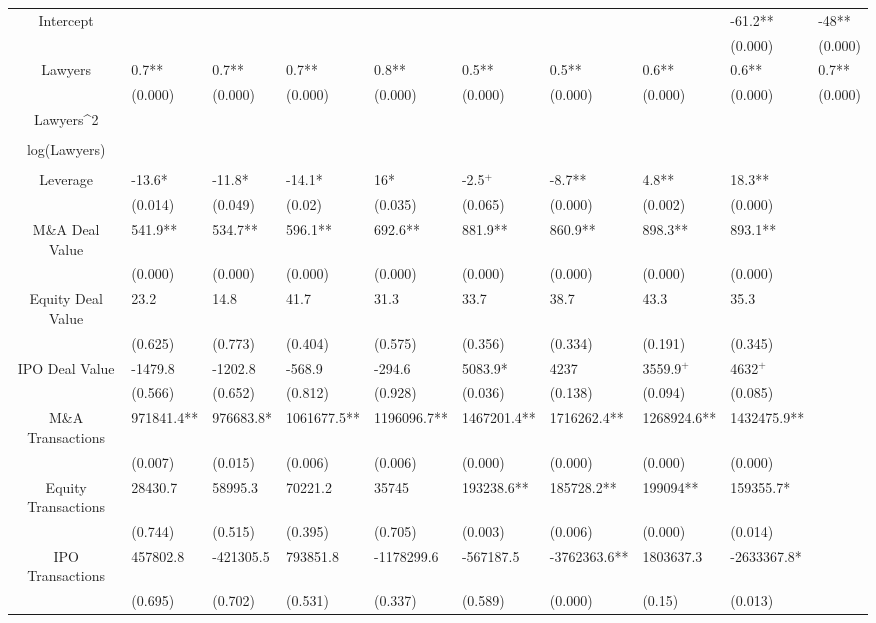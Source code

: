 \documentclass{article}
\begin{document}
\begin{table}[H]
\begin{tabular}{|clllllllll|}
Intercept &  &  &  &  &  &  &  & -61.2** & -48** \\ 
   &  &  &  &  &  &  &  & (0.000) & (0.000) \\ 
  Lawyers & 0.7** & 0.7** & 0.7** & 0.8** & 0.5** & 0.5** & 0.6** & 0.6** & 0.7** \\ 
   & (0.000) & (0.000) & (0.000) & (0.000) & (0.000) & (0.000) & (0.000) & (0.000) & (0.000) \\ 
  Lawyers^2 &  &  &  &  &  &  &  &  &  \\ 
   &  &  &  &  &  &  &  &  &  \\ 
  log(Lawyers) &  &  &  &  &  &  &  &  &  \\ 
   &  &  &  &  &  &  &  &  &  \\ 
  Leverage & -13.6* & -11.8* & -14.1* & 16* & -2.5$^{+}$ & -8.7** & 4.8** & 18.3** &  \\ 
   & (0.014) & (0.049) & (0.02) & (0.035) & (0.065) & (0.000) & (0.002) & (0.000) &  \\ 
  M\&A Deal Value & 541.9** & 534.7** & 596.1** & 692.6** & 881.9** & 860.9** & 898.3** & 893.1** &  \\ 
   & (0.000) & (0.000) & (0.000) & (0.000) & (0.000) & (0.000) & (0.000) & (0.000) &  \\ 
  Equity Deal Value & 23.2 & 14.8 & 41.7 & 31.3 & 33.7 & 38.7 & 43.3 & 35.3 &  \\ 
   & (0.625) & (0.773) & (0.404) & (0.575) & (0.356) & (0.334) & (0.191) & (0.345) &  \\ 
  IPO Deal Value & -1479.8 & -1202.8 & -568.9 & -294.6 & 5083.9* & 4237 & 3559.9$^{+}$ & 4632$^{+}$ &  \\ 
   & (0.566) & (0.652) & (0.812) & (0.928) & (0.036) & (0.138) & (0.094) & (0.085) &  \\ 
  M\&A Transactions & 971841.4** & 976683.8* & 1061677.5** & 1196096.7** & 1467201.4** & 1716262.4** & 1268924.6** & 1432475.9** &  \\ 
   & (0.007) & (0.015) & (0.006) & (0.006) & (0.000) & (0.000) & (0.000) & (0.000) &  \\ 
  Equity Transactions & 28430.7 & 58995.3 & 70221.2 & 35745 & 193238.6** & 185728.2** & 199094** & 159355.7* &  \\ 
   & (0.744) & (0.515) & (0.395) & (0.705) & (0.003) & (0.006) & (0.000) & (0.014) &  \\ 
  IPO Transactions & 457802.8 & -421305.5 & 793851.8 & -1178299.6 & -567187.5 & -3762363.6** & 1803637.3 & -2633367.8* &  \\ 
   & (0.695) & (0.702) & (0.531) & (0.337) & (0.589) & (0.000) & (0.15) & (0.013) &  \\ 

\end{tabular}
\end{table}
\end{document}
